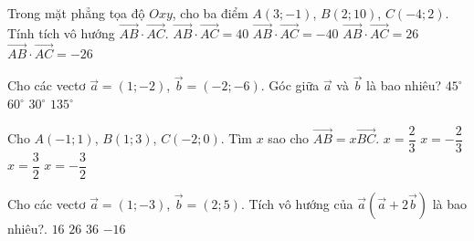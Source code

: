 \begin{ex}%
	Trong mặt phẳng tọa độ $Oxy$, cho ba điểm $A\left(3; -1\right)$, $B\left(2; 10\right)$, $C\left(-4; 2\right)$. Tính tích vô hướng $\overrightarrow{AB} \cdot \overrightarrow{AC}$.
	\choice
	{\True $\overrightarrow{AB} \cdot \overrightarrow{AC} = 40$}
	{$\overrightarrow{AB} \cdot \overrightarrow{AC} = -40$}
	{$\overrightarrow{AB} \cdot \overrightarrow{AC} = 26$}
	{$\overrightarrow{AB} \cdot \overrightarrow{AC} = -26$}
\end{ex}
\begin{ex}%
	Cho các vectơ $\overrightarrow{a} = \left(1; -2\right)$, $\overrightarrow{b} = \left(-2; -6\right)$. Góc giữa $\overrightarrow{a}$ và $\overrightarrow{b}$ là bao nhiêu?
	\choice
	{\True $45^\circ$}
	{$60^\circ$}
	{$30^\circ$}
	{$135^\circ$}
\end{ex}
\begin{ex}%
	Cho $A\left(-1; 1\right)$, $B\left(1; 3\right)$, $C\left(-2; 0\right)$. Tìm $x$ sao cho $\overrightarrow{AB} = x\overrightarrow{BC}$.
	\choice
	{$x = \dfrac{2}
	{3}$}
	{\True $x = -\dfrac{2}
	{3}$}
	{$x = \dfrac{3}{2}$}
	{$x = -\dfrac{3}{2}$}
\end{ex}
\begin{ex}%
	Cho các vectơ $\overrightarrow{a} = \left(1; -3\right)$,  $\overrightarrow{b} = \left(2; 5\right)$. Tích vô hướng của $\overrightarrow{a}\left(\overrightarrow{a} + 2\overrightarrow{b}\right)$ là bao nhiêu?.
	\choice
	{$16$}
	{$26$}
	{$36$}
	{\True $-16$}
\end{ex}
